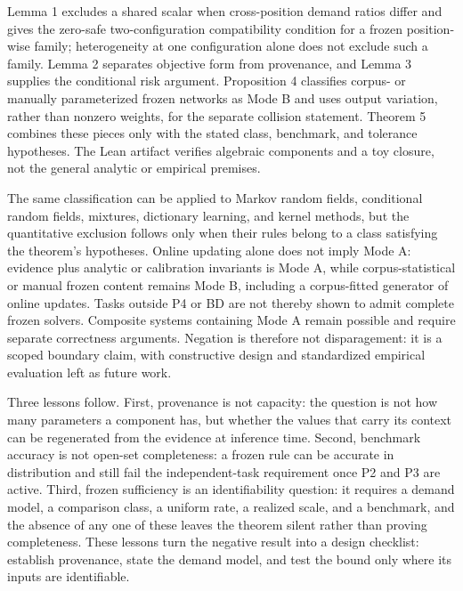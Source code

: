 \documentclass[twoside,11pt]{article}
\begin{document}
Lemma 1 excludes a shared scalar when cross-position demand ratios differ and gives the zero-safe two-configuration compatibility condition for a frozen position-wise family; heterogeneity at one configuration alone does not exclude such a family. Lemma 2 separates objective form from provenance, and Lemma 3 supplies the conditional risk argument. Proposition 4 classifies corpus- or manually parameterized frozen networks as Mode B and uses output variation, rather than nonzero weights, for the separate collision statement. Theorem 5 combines these pieces only with the stated class, benchmark, and tolerance hypotheses. The Lean artifact verifies algebraic components and a toy closure, not the general analytic or empirical premises.

The same classification can be applied to Markov random fields, conditional random fields, mixtures, dictionary learning, and kernel methods, but the quantitative exclusion follows only when their rules belong to a class satisfying the theorem's hypotheses. Online updating alone does not imply Mode A: evidence plus analytic or calibration invariants is Mode A, while corpus-statistical or manual frozen content remains Mode B, including a corpus-fitted generator of online updates. Tasks outside P4 or BD are not thereby shown to admit complete frozen solvers. Composite systems containing Mode A remain possible and require separate correctness arguments. Negation is therefore not disparagement: it is a scoped boundary claim, with constructive design and standardized empirical evaluation left as future work.

Three lessons follow. First, provenance is not capacity: the question is not how many parameters a component has, but whether the values that carry its context can be regenerated from the evidence at inference time. Second, benchmark accuracy is not open-set completeness: a frozen rule can be accurate in distribution and still fail the independent-task requirement once P2 and P3 are active. Third, frozen sufficiency is an identifiability question: it requires a demand model, a comparison class, a uniform rate, a realized scale, and a benchmark, and the absence of any one of these leaves the theorem silent rather than proving completeness. These lessons turn the negative result into a design checklist: establish provenance, state the demand model, and test the bound only where its inputs are identifiable.
\end{document}
